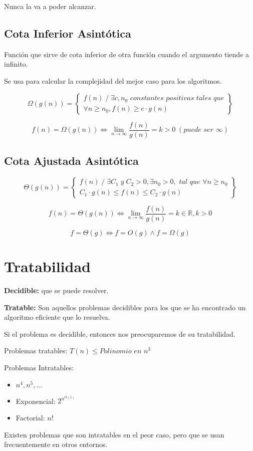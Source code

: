 Nunca la va a poder alcanzar.

\subsection{Cota Inferior Asintótica}
Función que sirve de cota inferior de otra función cuando el argumento tiende a infinito.

Se usa para calcular la complejidad del mejor caso para los algoritmos.

$$\Omega(g(n))=\left\{\begin{matrix}
		f(n)\;/\;\exists c, n_0 \textit{ constantes positivas tales que} \\
		\forall n \geq n_0, f(n) \geq c \cdot g(n)
	\end{matrix}\right\}$$

$$f(n)=\Omega(g(n)) \Leftrightarrow \lim_{n \rightarrow \infty} \frac{f(n)}{g(n)}= k > 0 \;(\textit{puede ser }\infty)$$

\subsection{Cota Ajustada Asintótica}
$$\Theta(g(n))=\left\{\begin{matrix}
		f(n)\;/\;\exists C_1 \;y\; C_2 >0, \exists n_0>0, \textit{ tal que } \forall n \geq n_0 \\
		C_1 \cdot g(n) \leq f(n) \leq C_2 \cdot g(n)
	\end{matrix}\right\}$$

$$f(n)=\Theta(g(n)) \Leftrightarrow \lim_{n \rightarrow \infty} \frac{f(n)}{g(n)}= k \in \mathbb{R}, k > 0$$

$$f = \Theta(g) \Leftrightarrow f = O(g) \wedge f = \Omega(g) $$

\section{Tratabilidad}\label{sec:tratabilidad}
\textbf{Decidible:} que se puede resolver.

\textbf{Tratable:} Son aquellos problemas decidibles para los que se ha encontrado un algoritmo eficiente que lo resuelva.

Si el problema es decidible, entonces nos preocuparemos de su tratabilidad.

Problemas tratables: $T(n) \leq \textit{Polinomio en } n^3$

Problemas Intratables:
\begin{itemize}
	\item $n^4, n^5, ...$
	\item Exponencial: $2^{n^{O(1)}}$
	\item Factorial: $n!$
\end{itemize}

Existen problemas que son intratables en el peor caso, pero que se usan frecuentemente en otros entornos.